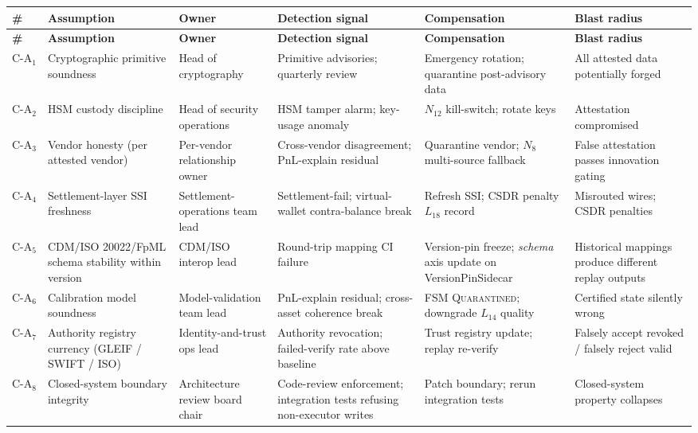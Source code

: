 \documentclass[11pt,a4paper]{article}
\begin{document}
\begin{center}
\renewcommand{\arraystretch}{1.15}
\begin{longtable}{@{}p{1.2cm}p{3.4cm}p{2.6cm}p{3.6cm}p{2.6cm}p{2cm}@{}}
\toprule
\textbf{\#} & \textbf{Assumption} & \textbf{Owner} & \textbf{Detection signal} & \textbf{Compensation} & \textbf{Blast radius} \\
\midrule
\endfirsthead
\toprule
\textbf{\#} & \textbf{Assumption} & \textbf{Owner} & \textbf{Detection signal} & \textbf{Compensation} & \textbf{Blast radius} \\
\midrule
\endhead
\bottomrule
\endfoot
$\mathrm{C\textrm{-}A}_1$  & Cryptographic primitive soundness & Head of cryptography & Primitive advisories; quarterly review & Emergency rotation; quarantine post-advisory data & All attested data potentially forged \\
$\mathrm{C\textrm{-}A}_2$  & HSM custody discipline & Head of security operations & HSM tamper alarm; key-usage anomaly & $N_{12}$ kill-switch; rotate keys & Attestation compromised \\
$\mathrm{C\textrm{-}A}_3$  & Vendor honesty (per attested vendor) & Per-vendor relationship owner & Cross-vendor disagreement; PnL-explain residual & Quarantine vendor; $N_8$ multi-source fallback & False attestation passes innovation gating \\
$\mathrm{C\textrm{-}A}_4$  & Settlement-layer SSI freshness & Settlement-operations team lead & Settlement-fail; virtual-wallet contra-balance break & Refresh SSI; CSDR penalty $L_{18}$ record & Misrouted wires; CSDR penalties \\
$\mathrm{C\textrm{-}A}_5$  & CDM/ISO 20022/FpML schema stability within version & CDM/ISO interop lead & Round-trip mapping CI failure & Version-pin freeze; \emph{schema} axis update on VersionPinSidecar & Historical mappings produce different replay outputs \\
$\mathrm{C\textrm{-}A}_6$  & Calibration model soundness & Model-validation team lead & PnL-explain residual; cross-asset coherence break & FSM \textsc{Quarantined}; downgrade $L_{14}$ quality & Certified state silently wrong \\
$\mathrm{C\textrm{-}A}_7$  & Authority registry currency (GLEIF / SWIFT / ISO) & Identity-and-trust ops lead & Authority revocation; failed-verify rate above baseline & Trust registry update; replay re-verify & Falsely accept revoked / falsely reject valid \\
$\mathrm{C\textrm{-}A}_8$  & Closed-system boundary integrity & Architecture review board chair & Code-review enforcement; integration tests refusing non-executor writes & Patch boundary; rerun integration tests & Closed-system property collapses \\

\end{longtable}
\end{center}
\end{document}
